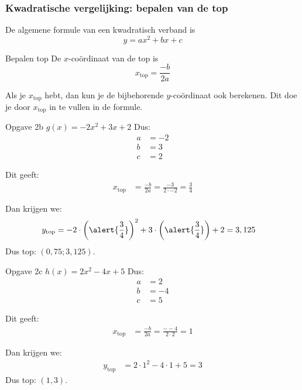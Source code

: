 \begin{frame}
\frametitle{Kwadratische vergelijking: bepalen van de top}
De algemene formule van een kwadratisch verband is \[y = ax^2 + bx + c\]

\begin{alertblock}{Bepalen top}
De $x$-co\"ordinaat van de top is
\[
 x_{\text{top}} = \frac{-b}{2a}
\]

Als je $x_{\text{top}}$ hebt, dan kun je de bijbehorende $y$-co\"ordinaat ook berekenen. Dit doe je door $x_{\text{top}}$ in te vullen in de formule.
\end{alertblock}
\end{frame}

\begin{frame}
\begin{block}{Opgave 2b}
$g(x) = -2x^2 + 3x + 2$
Dus:
\begin{align*}
 a &= -2\\
 b &= 3 \\
 c &= 2
\end{align*}

Dit geeft:
\begin{align*}
 x_{\text{top}} &= \frac{-b}{2a} = \frac{-3}{2 \cdot -2} = \frac{3}{4}
\end{align*}

Dan krijgen we:
\begin{align*}
 y_{\text{top}} &= -2 \cdot \left(\alert{ \frac{3}{4}} \right)^2 + 3 \cdot \left(\alert{\frac{3}{4}}\right) + 2 = 3,125
\end{align*}
Dus top: $(0,75;3,125)$.
\end{block}
\end{frame}

\begin{frame}
\begin{block}{Opgave 2c}
$h(x) = 2x^2 -4x + 5$
Dus:
\begin{align*}
 a &= 2\\
 b &= -4 \\
 c &= 5
\end{align*}

Dit geeft:
\begin{align*}
 x_{\text{top}} &= \frac{-b}{2a} = \frac{- - 4 }{2 \cdot 2} = 1
 \end{align*}

Dan krijgen we:
\begin{align*}
 y_{\text{top}} &= 2 \cdot 1^2 - 4\cdot 1 + 5 = 3
 \end{align*}
Dus top: $(1,3)$.
\end{block}
\end{frame}

